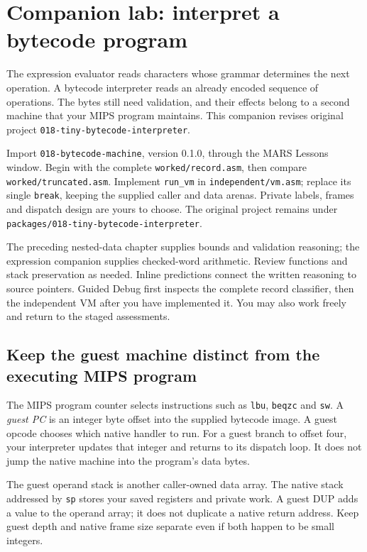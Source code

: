 \section{Companion lab: interpret a bytecode program}
\label{revision-lab:bytecode}

The expression evaluator reads characters whose grammar determines the next
operation. A bytecode interpreter reads an already encoded sequence of operations.
The bytes still need validation, and their effects belong to a second machine
that your MIPS program maintains. This companion revises original project
\texttt{018-tiny-bytecode-interpreter}.

Import \texttt{018-bytecode-machine}, version 0.1.0, through the MARS Lessons
window. Begin with the complete \texttt{worked/record.asm}, then compare
\texttt{worked/truncated.asm}. Implement \texttt{run\_vm} in
\texttt{independent/vm.asm}; replace its single \texttt{break}, keeping the supplied
caller and data arenas. Private labels, frames and dispatch design are yours to
choose. The original project remains under
\texttt{packages/018-tiny-bytecode-interpreter}.

The preceding nested-data chapter supplies bounds and validation reasoning; the
expression companion supplies checked-word arithmetic. Review functions and stack
preservation as needed. Inline predictions connect the written reasoning to
source pointers. Guided Debug first inspects the complete record classifier,
then the independent VM after you have implemented it. You may also work freely
and return to the staged assessments.

\subsection*{Keep the guest machine distinct from the executing MIPS program}

The MIPS program counter selects instructions such as \texttt{lbu},
\texttt{beqzc} and \texttt{sw}. A \emph{guest PC} is an integer byte offset into
the supplied bytecode image. A guest opcode chooses which native handler to run.
For a guest branch to offset four, your interpreter updates that integer and
returns to its dispatch loop. It does not jump the native machine into the
program's data bytes.

The guest operand stack is another caller-owned data array. The native stack
addressed by \texttt{sp} stores your saved registers and private work. A guest
DUP adds a value to the operand array; it does not duplicate a native return
address. Keep guest depth and native frame size separate even if both happen
to be small integers.

